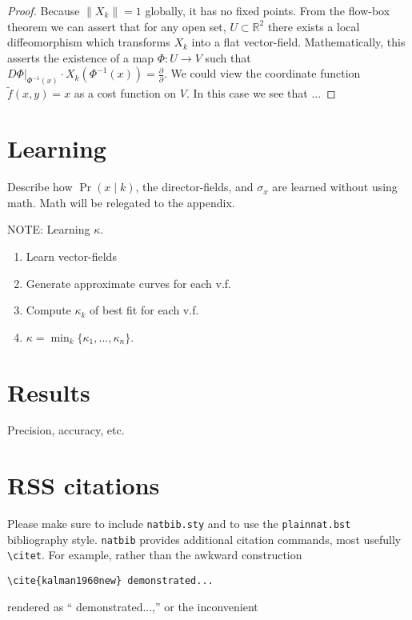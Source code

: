\documentclass[conference]{IEEEtran}
\newcommand{\pder}[2]{\ensuremath{\frac{\partial #1}{\partial #1}}}
\begin{document}
\begin{proof}
	Because $\| X_k \| = 1$ globally, it has no fixed points.
	From the flow-box theorem we can assert that for any open set, $U \subset \mathbb{R}^2$ there exists a local diffeomorphism which transforms $X_k$ into a flat vector-field.
	Mathematically, this asserts the existence of a map $\Phi : U \to V$ such that $ \left. D\Phi \right|_{\Phi^{-1}(x) } \cdot X_k(  \Phi^{-1}(x) ) = \pder{}{x}$.
	We could view the coordinate function $\tilde{f}(x,y) = x$ as a cost function on $V$.
	In this case we see that
	...
\end{proof}

\section{Learning} \label{sec:learning}
  Describe how $\Pr(x \mid k)$, the director-fields, and $\sigma_x$ are learned without using math.
  Math will be relegated to the appendix.
  
  NOTE:  Learning $\kappa$.
  \begin{enumerate}
  	\item Learn vector-fields
	\item Generate approximate curves for each v.f.
	\item Compute $\kappa_k$ of best fit for each v.f.
	\item $\kappa = \min_k \{ \kappa_1,\dots,\kappa_n\}$.
  \end{enumerate}
  
\section{Results}
 Precision, accuracy, etc.

\section{RSS citations}

Please make sure to include \verb!natbib.sty! and to use the
\verb!plainnat.bst! bibliography style. \verb!natbib! provides additional
citation commands, most usefully \verb!\citet!. For example, rather than the
awkward construction 

{\small
\begin{verbatim}
\cite{kalman1960new} demonstrated...
\end{verbatim}
}

\noindent
rendered as ``\cite{kalman1960new} demonstrated...,''
or the
inconvenient 
\end{document}
